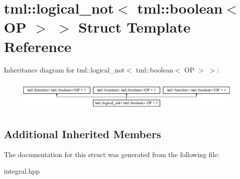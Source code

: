\hypertarget{structtml_1_1logical__not_3_01tml_1_1boolean_3_01OP_01_4_01_4}{\section{tml\+:\+:logical\+\_\+not$<$ tml\+:\+:boolean$<$ O\+P $>$ $>$ Struct Template Reference}
\label{structtml_1_1logical__not_3_01tml_1_1boolean_3_01OP_01_4_01_4}
}
Inheritance diagram for tml\+:\+:logical\+\_\+not$<$ tml\+:\+:boolean$<$ O\+P $>$ $>$\+:\begin{figure}[H]
\begin{center}
\leavevmode
\includegraphics[height=1.595442cm]{structtml_1_1logical__not_3_01tml_1_1boolean_3_01OP_01_4_01_4}
\end{center}
\end{figure}
\subsection*{Additional Inherited Members}


The documentation for this struct was generated from the following file\+:\begin{DoxyCompactItemize}
\item 
integral.\+hpp\end{DoxyCompactItemize}
